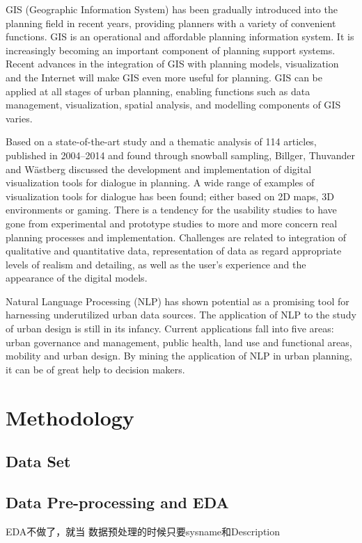 GIS (Geographic Information System) has been gradually introduced into the planning field in recent years, providing planners with a variety of convenient functions.\cite{bib7} GIS is an operational and affordable planning information system. It is increasingly becoming an important component of planning support systems. Recent advances in the integration of GIS with planning models, visualization and the Internet will make GIS even more useful for planning. GIS can be applied at all stages of urban planning, enabling functions such as data management, visualization, spatial analysis, and modelling components of GIS varies.

Based on a state-of-the-art study and a thematic analysis of 114 articles, published in 2004–2014 and found through snowball sampling, Billger, Thuvander and Wästberg\cite{bib8} discussed the development and implementation of digital visualization tools for dialogue in planning. A wide range of examples of visualization tools for dialogue has been found; either based on 2D maps, 3D environments or gaming. There is a tendency for the usability studies to have gone from experimental and prototype studies to more and more concern real planning processes and implementation. Challenges are related to integration of qualitative and quantitative data, representation of data as regard appropriate levels of realism and detailing, as well as the user’s experience and the appearance of the digital models.

 Natural Language Processing (NLP) has shown potential as a promising tool for harnessing underutilized urban data sources\cite{bib9}. The application of NLP to the study of urban design is still in its infancy. Current applications fall into five areas: urban governance and management, public health, land use and functional areas, mobility and urban design. By mining the application of NLP in urban planning, it can be of great help to decision makers.


\section* {Methodology}
\subsection* {Data Set}




\subsection*{Data Pre-processing and EDA}
EDA不做了，就当
数据预处理的时候只要sysname和Description

